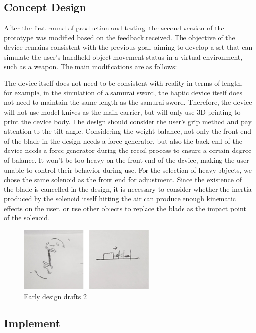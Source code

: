 \subsection{Concept Design}
After the first round of production and testing, the second version of the prototype was modified based on the feedback received. The objective of the device remains consistent with the previous goal, aiming to develop a set that can simulate the user's handheld object movement status in a virtual environment, such as a weapon. The main modifications are as follows:

The device itself does not need to be consistent with reality in terms of length, for example, in the simulation of a samurai sword, the haptic device itself does not need to maintain the same length as the samurai sword. Therefore, the device will not use model knives as the main carrier, but will only use 3D printing to print the device body. The design should consider the user's grip method and pay attention to the tilt angle.
Considering the weight balance, not only the front end of the blade in the design needs a force generator, but also the back end of the device needs a force generator during the recoil process to ensure a certain degree of balance. It won't be too heavy on the front end of the device, making the user unable to control their behavior during use. For the selection of heavy objects, we chose the same solenoid as the front end for adjustment.
Since the existence of the blade is cancelled in the design, it is necessary to consider whether the inertia produced by the solenoid itself hitting the air can produce enough kinematic effects on the user, or use other objects to replace the blade as the impact point of the solenoid.

\begin{figure}[h]
\centering
\includegraphics[width=0.6\textwidth]{A_thesis/figures/023.png}
\caption{Early design drafts 2}
\end{figure}

\subsection{Implement}
